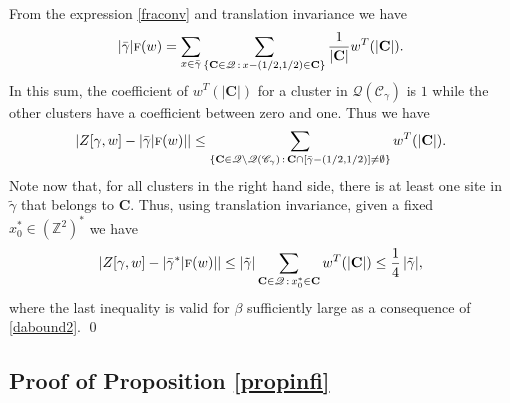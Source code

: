 \documentclass[10pt]{amsart}
\let\mathcal\mathscr
\newcommand{\sep}{\,:\,}
\numberwithin{equation}{section}
\theoremstyle{plain}
\theoremstyle{definition}
\newcommand{\cQ}{{\ensuremath{\mathcal Q}} }
\newcommand{\cC}{{\ensuremath{\mathcal C}} }
\newcommand{\bC}{{\ensuremath{\mathbf C}} }
\newcommand{\bbZ}{{\ensuremath{\mathbb Z}} }
\newcommand{\gb}{\beta}
\newcommand{\gga}{\gamma}
\newcommand{\tf}{\textsc{f}}
\begin{document}
From the expression \eqref{fraconv} and translation invariance we have
\begin{equation*}
|\bar \gamma|\tf(w)= \sum_{x\in \bar \gamma }\sum_{\{\bC\in \cQ \sep x-(1/2,1/2) \in \bC\}} \frac{1}{|\bC|}w^T(|\bC|).
\end{equation*}
In this sum, the coefficient of $w^T(|\bC|)$ for a cluster in $\cQ(\cC_{\gga})$ is $1$ while the other clusters have a coefficient between zero and one.
Thus we have
\begin{equation*}
\left|Z[\gamma,w]- |\bar \gamma|\tf(w)| \right|\le \sum_{\{\bC\in \cQ\setminus \cQ(\cC_{\gamma}) \sep \bC\cap [\bar \gamma-(1/2,1/2)]\ne \emptyset \}} w^T(|\bC|).
\end{equation*}
Note now that, for all clusters in the right hand side, there is at least one site in $\tilde \gamma$ that belongs to $\bC$. Thus, using translation invariance,
given a fixed $x^*_0\in (\bbZ^2)^*$ we have
\begin{equation*}
\left|Z[\gamma,w]- |\bar \gamma^*|\tf(w)| \right|\le |\tilde \gamma|\sum_{\bC\in \cQ \sep x_0^* \in \bC} w^T(|\bC|)\le \frac{1}{4}\,|\tilde \gamma|,
\end{equation*}
where the last inequality is valid for $\gb$ sufficiently large as a consequence of \eqref{dabound2}.
\qed

\subsection{Proof of Proposition \ref{propinfi}}\label{ppropinf}
\end{document}

